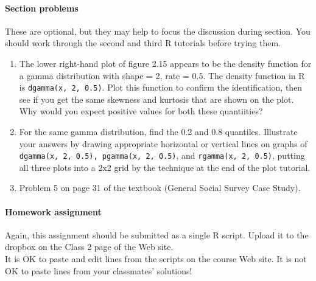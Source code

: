 \documentclass[12pt]{article}
\begin{document}
\pagebreak


\paragraph*{Section problems}

These are optional, but they may help to focus the discussion during section. You should work through the second and third R tutorials before trying them.
\begin{enumerate}
\item The lower right-hand plot of figure 2.15 appears to be the density function for a gamma distribution with shape = 2, rate = 0.5. The density function in R is \verb!dgamma(x, 2, 0.5)!.
Plot this function to confirm the identification, then see if you get the same skewness and kurtosis that are shown on the plot. Why would you expect positive values for both these quantiities?

\item For the same gamma distribution, find the 0.2 and 0.8 quantiles. Illustrate your answers by drawing appropriate horizontal or vertical lines on graphs of \verb!dgamma(x, 2, 0.5), pgamma(x, 2, 0.5)!, and \verb!rgamma(x, 2, 0.5)!, putting all three plots into a 2x2 grid by the technique at the end of the plot tutorial.

\item Problem 5 on page 31 of the textbook (General Social Survey Case Study).
\end{enumerate}

\pagebreak


\paragraph*{Homework assignment}

Again, this assignment should be submitted as a single R script.  Upload it to the dropbox on the Class 2 page of the Web site. \\

It is OK to paste and edit lines from the scripts on the course Web site. It is not OK to paste lines from your classmates' solutions!
\end{document}
